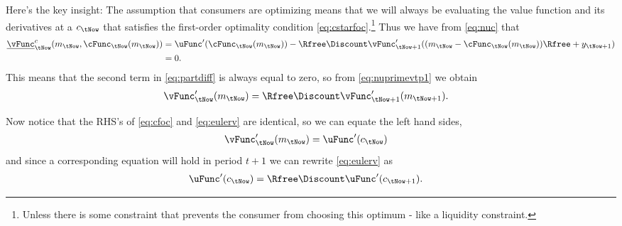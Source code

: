 Here's the key insight:  The assumption that consumers are optimizing
means that we will always be evaluating the value function and its
derivatives at a ${c}_{\tNow}$
that satisfies the first-order optimality condition \eqref{eq:cstarfoc}.\footnote{Unless there is some constraint that prevents the consumer from choosing this optimum - like a liquidity constraint.}  Thus
we have from \eqref{eq:nuc} that
\begin{equation}\begin{gathered}\begin{aligned}
        \underline{\vFunc}_{\tNow}^{c}({m}_{\tNow},\cFunc_{\tNow}({m}_{\tNow})) & =  \uFunc^{\prime}(\cFunc_{\tNow}({m}_{\tNow})) - \Rfree\Discount \vFunc^{\prime}_{\tNow+1}(({m}_{\tNow}-\cFunc_{\tNow}({m}_{\tNow}))\Rfree+{y}_{\tNow+1})
\\ & =  0.
\end{aligned}\end{gathered}\end{equation}
This means that the second term in \eqref{eq:partdiff}
is always equal to zero, so from \eqref{eq:nuprimevtp1} we obtain
\begin{equation}\begin{gathered}\begin{aligned}
        \vFunc^{\prime}_{\tNow}({m}_{\tNow}) & =  \Rfree \Discount \vFunc_{\tNow+1}^{\prime}({m}_{\tNow+1}). \label{eq:eulerv}
\end{aligned}\end{gathered}\end{equation}

Now notice that the RHS's of \eqref{eq:cfoc} and \eqref{eq:eulerv} are
identical, so we can equate the left hand sides,
\begin{equation}\begin{gathered}\begin{aligned}
        \vFunc_{\tNow}^{\prime}({m}_{\tNow}) & =  \uFunc^{\prime}({c}_{\tNow})
\end{aligned}\end{gathered}\end{equation}
and since a corresponding equation will hold in period $t+1$
we can rewrite \eqref{eq:eulerv} as
\begin{equation}\begin{gathered}\begin{aligned}
        \uFunc^{\prime}({c}_{\tNow}) & =  \Rfree \Discount \uFunc^{\prime}({c}_{\tNow+1}).
\end{aligned}\end{gathered}\end{equation}

